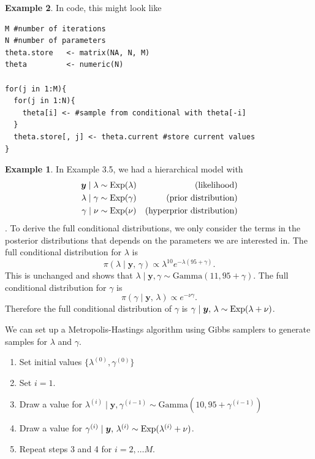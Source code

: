 \documentclass[
]{book}
\theoremstyle{definition}
\theoremstyle{definition}
\newtheorem{example}{Example}[chapter]
\theoremstyle{definition}
\theoremstyle{definition}
\theoremstyle{remark}
\begin{document}
\begin{example}
In code, this might look like

\begin{verbatim}
M #number of iterations
N #number of parameters
theta.store   <- matrix(NA, N, M)
theta         <- numeric(N)

for(j in 1:M){
  for(j in 1:N){
    theta[i] <- #sample from conditional with theta[-i]
  }
  theta.store[, j] <- theta.current #store current values
}
\end{verbatim}

\begin{example}
In Example 3.5, we had a hierarchical model with\\
\begin{align*}
\boldsymbol{y} \mid \lambda &\sim \hbox{Exp}(\lambda) & \textrm{(likelihood)} \\
\lambda \mid \gamma &\sim \hbox{Exp}(\gamma) & \textrm{(prior distribution)} \\
\gamma \mid \nu &\sim \hbox{Exp}(\nu) & \textrm{(hyperprior distribution)}  \\
\end{align*}.
To derive the full conditional distributions, we only consider the terms in the posterior distributions that depends on the parameters we are interested in. The full conditional distribution for \(\lambda\) is
\[
\pi(\lambda \mid \boldsymbol{y}, \,\gamma) \propto \lambda^{10}e^{-\lambda(95 + \gamma)}.
\]
This is unchanged and shows that \(\lambda \mid \boldsymbol{y}, \gamma \sim \textrm{Gamma}(11, 95 + \gamma)\). The full conditional distribution for \(\gamma\) is
\[
\pi(\gamma \mid \boldsymbol{y}, \,\lambda) \propto e^{-\nu\gamma}.
\]
Therefore the full conditional distribution of \(\gamma\) is \(\gamma \mid \boldsymbol{y}, \,\lambda \sim \hbox{Exp}(\lambda + \nu)\).

We can set up a Metropolis-Hastings algorithm using Gibbs samplers to generate samples for \(\lambda\) and \(\gamma\).

\begin{enumerate}
\def\labelenumi{\arabic{enumi}.}
\item
  Set initial values \(\{\lambda^{(0)}, \gamma^{(0)}\}\)
\item
  Set \(i = 1\).
\item
  Draw a value for \(\lambda^{(i)} \mid \boldsymbol{y}, \gamma^{(i-1)} \sim \textrm{Gamma}(10, 95 + \gamma^{(i-1)})\)
\item
  Draw a value for \(\gamma^{(i)} \mid \boldsymbol{y}, \,\lambda^{(i)} \sim \hbox{Exp}(\lambda^{(i)} + \nu)\).
\item
  Repeat steps 3 and 4 for \(i = 2, \ldots M\).
\end{enumerate}


\end{example}
\end{example}
\end{document}
